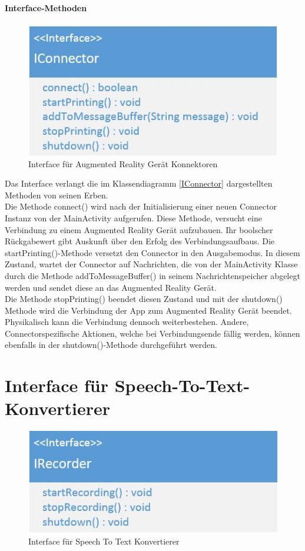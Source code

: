 \paragraph{Interface-Methoden}
\begin{figure}
	\includegraphics[width=\linewidth]{../images/iconnector.jpg}
	\caption{Interface für Augmented Reality Gerät Konnektoren}
	\label{fig:IConnector}
\end{figure}
Das Interface verlangt die im Klassendiagramm \ref{IConnector} dargestellten Methoden von seinen Erben.\\
Die Methode connect() wird nach der Initialisierung einer neuen Connector Instanz von der MainActivity aufgerufen. Diese Methode, versucht eine Verbindung zu einem Augmented Reality Gerät aufzubauen. Ihr boolscher Rückgabewert gibt Auskunft über den Erfolg des Verbindungsaufbaus.
Die startPrinting()-Methode versetzt den Connector in den Ausgabemodus. In diesem Zustand, wartet der Connector auf Nachrichten, die von der MainActivity Klasse durch die Methode addToMessageBuffer() in seinem Nachrichtenspeicher abgelegt werden und sendet diese an das Augmented Reality Gerät.\\
Die Methode stopPrinting() beendet diesen Zustand und mit der shutdown() Methode wird die Verbindung der App zum Augmented Reality Gerät beendet. Physikalisch kann die Verbindung dennoch weiterbestehen. Andere, Connectorspezifische Aktionen, welche bei Verbindungsende fällig werden, können ebenfalls in der shutdown()-Methode durchgeführt werden.
\section{Interface für Speech-To-Text-Konvertierer}
\begin{figure}
	\includegraphics[width=\linewidth]{../images/IRecorder.JPG}
	\caption{Interface für Speech To Text Konvertierer}
	\label{fig:IRecorder}
\end{figure}